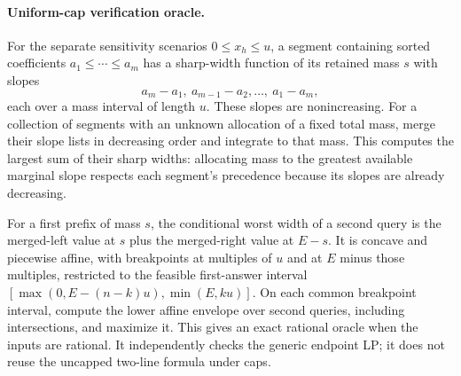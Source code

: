 \paragraph{Uniform-cap verification oracle.}
For the separate sensitivity scenarios $0\leq x_h\leq u$, a segment
containing sorted coefficients $a_1\leq\cdots\leq a_m$ has a sharp-width
function of its retained mass $s$ with slopes
\[
 a_m-a_1,\ a_{m-1}-a_2,\ldots,\ a_1-a_m,
\]
each over a mass interval of length $u$. These slopes are nonincreasing.
For a collection of segments with an unknown allocation of a fixed total
mass, merge their slope lists in decreasing order and integrate to that
mass. This computes the largest sum of their sharp widths: allocating
mass to the greatest available marginal slope respects each segment's
precedence because its slopes are already decreasing.

For a first prefix of mass $s$, the conditional worst width of a second
query is the merged-left value at $s$ plus the merged-right value at
$E-s$. It is concave and piecewise affine, with breakpoints at multiples
of $u$ and at $E$ minus those multiples, restricted to the feasible
first-answer interval
$[\max(0,E-(n-k)u),\min(E,ku)]$.
On each common breakpoint interval, compute the lower affine envelope
over second queries, including intersections, and maximize it. This gives
an exact rational oracle when the inputs are rational. It independently
checks the generic endpoint LP; it does not reuse the uncapped two-line
formula under caps.
